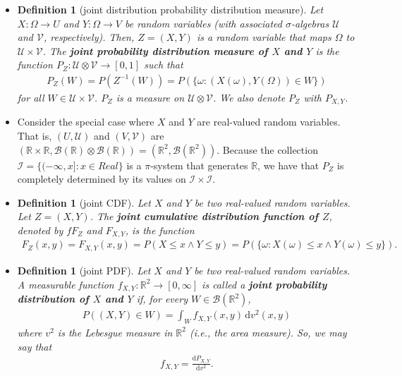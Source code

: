 \documentclass[10pt]{article}
\newtheorem{definition}[lemma]{Definition}
\numberwithin{lemma}{section}
\newcommand{\dee}{\mathrm{d}}
\newcommand{\mcal}[1]{\mathcal{#1}}
\newcommand{\Real}{\mathbb{R}}
\begin{document}
\begin{itemize}
  \item \begin{definition}[joint distribution probability distribution measure]
    Let $X: \Omega \rightarrow U$ and $Y: \Omega \rightarrow V$ be random variables (with associated $\sigma$-algebras $\mcal{U}$ and $\mcal{V}$, respectively). Then, $Z = (X,Y)$ is a random variable that maps $\Omega$ to $\mcal{U} \times \mcal{V}$. The {\bf joint probability distribution measure of $X$ and $Y$} is the function $P_Z: \mcal{U} \otimes \mcal{V} \rightarrow [0,1]$ such that
    \begin{align*}
      P_Z(W) = P(Z^{-1}(W)) = P(\{ \omega : (X(\omega), Y(\Omega)) \in W \})
    \end{align*} 
    for all $W \in \mcal{U} \times \mcal{V}$. $P_Z$ is a measure on $\mcal{U} \otimes \mcal{V}$. We also denote $P_Z$ with $P_{X,Y}$. 
  \end{definition}
 
  \item Consider the special case where $X$ and $Y$ are real-valued random variables. That is, $(U,\mcal{U})$ and $(V,\mcal{V})$  are $(\Real \times \Real, \mcal{B}(\Real) \otimes \mcal{B}(\Real)) = (\Real^2, \mcal{B}(\Real^2))$. Because the collection $\mcal{I} =\{(-\infty, x] : x \in Real \}$ is a $\pi$-system that generates $\Real$, we have that $P_Z$ is completely determined by its values on $\mcal{I} \times \mcal{I}$.
  
  \item \begin{definition}[joint CDF]
    Let $X$ and $Y$ be two real-valued random variables. Let $Z = (X,Y)$. The {\bf joint cumulative distribution function of $Z$}, denoted by $fF_Z$ and $F_{X,Y}$, is the function
    \begin{align*}
      F_Z(x,y) = F_{X,Y}(x, y) = P(X \leq x \wedge Y \leq y) = P(\{ \omega: X(\omega) \leq x \wedge Y(\omega) \leq y \}).
    \end{align*} 
  \end{definition}

  \item \begin{definition}[joint PDF]
    Let $X$ and $Y$ be two real-valued random variables. A measurable function $f_{X,Y}: \Real^2 \rightarrow [0,\infty]$ is called a {\bf joint probability distribution of $X$ and $Y$} if, for every $W \in \mcal{B}(\Real^2)$, 
    \begin{align*}
      P((X,Y) \in W) = \int_W f_{X,Y}(x,y)\, \dee v^2(x,y) 
    \end{align*}
    where $v^2$ is the Lebesgue measure in $\Real^2$ (i.e., the area measure). So, we may say that
    \begin{align*}
      f_{X,Y} = \frac{\dee P_{X,Y}}{\dee v^2}.
    \end{align*}
  \end{definition}


\end{itemize}
\end{document}
